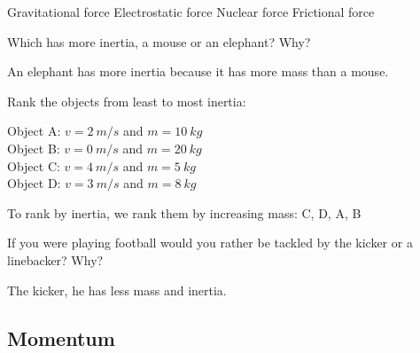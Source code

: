 \documentclass[]{exam}
\begin{document}
\begin{questions}
\begin{randomizechoices}
    \choice Gravitational force
    \choice Electrostatic force
    \choice Nuclear force
    \correctchoice Frictional force
\end{randomizechoices}

    
\question
Which has more inertia, a mouse or an elephant? Why?

\begin{solution}
    An elephant has more inertia because it has more mass than a mouse.
\end{solution}

\question
Rank the objects from least to most inertia:

Object A: $v = \SI{2}{m/s}$ and $m = \SI{10}{kg}$\\
Object B: $v = \SI{0}{m/s}$ and $m = \SI{20}{kg}$\\
Object C: $v = \SI{4}{m/s}$ and $m = \SI{5}{kg}$\\
Object D: $v = \SI{3}{m/s}$ and $m = \SI{8}{kg}$

\begin{solution}
    To rank by inertia, we rank them by increasing mass: C, D, A, B
\end{solution}

\question
If you were playing football would you rather be tackled by the kicker or a linebacker? Why?

\begin{solution}
    The kicker, he has less mass and inertia.
\end{solution}

\end{questions}

\clearpage

\subsection{Momentum}
\end{document}
